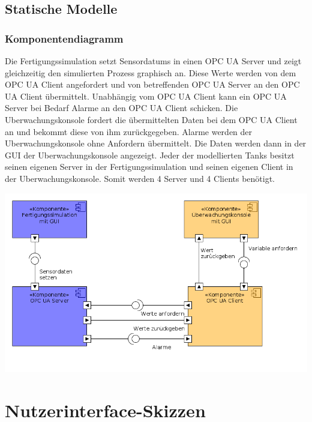 \documentclass[parskip=full]{scrartcl}
\begin{document}
\subsection{Statische Modelle}
\subsubsection{Komponentendiagramm}
Die \gls{Fertigungssimulation} setzt \glspl{Sensordatum} in einen \gls{OPC UA Server} und zeigt
gleichzeitig den simulierten Prozess graphisch an. Diese Werte werden von dem \gls{OPC UA Client} angefordert
und von betreffenden \gls{OPC UA Server} an den \gls{OPC UA Client} übermittelt. Unabhängig vom \gls{OPC UA Client}
kann ein \gls{OPC UA Server} bei Bedarf Alarme an den \gls{OPC UA Client} schicken.
Die \gls{Uberwachungskonsole} fordert die übermittelten Daten bei dem \gls{OPC UA Client} an und bekommt
diese von ihm zurückgegeben. Alarme werden der \gls{Uberwachungskonsole} ohne Anfordern übermittelt.
Die Daten werden dann in der \gls{GUI} der \gls{Uberwachungskonsole} angezeigt. Jeder der modellierten Tanks
besitzt seinen eigenen Server in der \gls{Fertigungssimulation} und seinen eigenen Client in der \gls{Uberwachungskonsole}.
Somit werden 4 Server und 4 Clients benötigt.
\begin{center}
  \includegraphics[scale=0.5]{media/ComponentDiagram/componentDiagram.png}
\end{center}


\section{Nutzerinterface-Skizzen}
\end{document}

